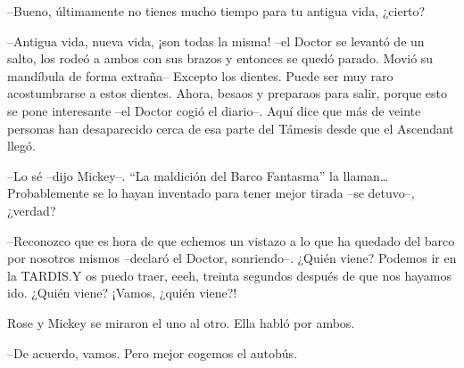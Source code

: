 {--Bueno, últimamente no tienes mucho tiempo para tu antigua vida,
¿cierto?}

{--Antigua vida, nueva vida, ¡son todas la misma! --el Doctor se levantó
 de un salto, los rodeó a ambos con sus brazos y entonces se quedó
 parado. Movió su mandíbula de forma extraña-- Excepto los dientes. Puede
 ser muy raro acostumbrarse a estos dientes. Ahora, besaos y preparaos
 para salir, porque esto se pone interesante --el Doctor cogió el
 diario--. Aquí dice que más de veinte personas han desaparecido cerca de
esa parte del Támesis desde que el Ascendant llegó.}

{--Lo sé --dijo Mickey--. ``La maldición del Barco Fantasma'' la
 llaman\ldots{} Probablemente se lo hayan inventado para tener mejor
tirada --se detuvo--, ¿verdad?}

{--Reconozco que es hora de que echemos un vistazo a lo que ha quedado
 del barco por nosotros mismos --declaró el Doctor, sonriendo--. ¿Quién
 viene? Podemos ir en la TARDIS.\@ Y os puedo traer, eeeh, treinta segundos
después de que nos hayamos ido. ¿Quién viene? ¡Vamos, ¿quién viene?!}

{Rose y Mickey se miraron el uno al otro. Ella habló por ambos.}

{--De acuerdo, vamos. Pero mejor cogemos el autobús.}
